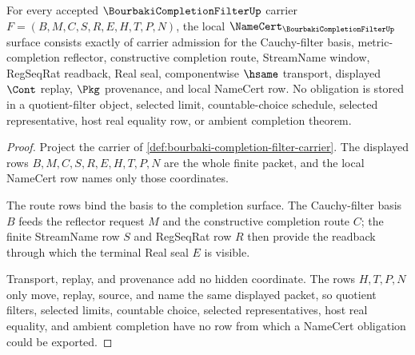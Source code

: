\begin{theorem}
\label{thm:bourbaki-completion-filter-namecert-obligations}
For every accepted $\BourbakiCompletionFilterUp$ carrier $F=(B,M,C,S,R,E,H,T,P,N)$, the local $\NameCert_{\BourbakiCompletionFilterUp}$ surface consists exactly of carrier admission for the Cauchy-filter basis, metric-completion reflector, constructive completion route, StreamName window, RegSeqRat readback, Real seal, componentwise $\hsame$ transport, displayed $\Cont$ replay, $\Pkg$ provenance, and local NameCert row. No obligation is stored in a quotient-filter object, selected limit, countable-choice schedule, selected representative, host real equality row, or ambient completion theorem.
\end{theorem}
\begin{proof}
Project the carrier of \autoref{def:bourbaki-completion-filter-carrier}. The displayed rows $B,M,C,S,R,E,H,T,P,N$ are the whole finite packet, and the local NameCert row names only those coordinates.

The route rows bind the basis to the completion surface. The Cauchy-filter basis $B$ feeds the reflector request $M$ and the constructive completion route $C$; the finite StreamName row $S$ and RegSeqRat row $R$ then provide the readback through which the terminal Real seal $E$ is visible.

Transport, replay, and provenance add no hidden coordinate. The rows $H,T,P,N$ only move, replay, source, and name the same displayed packet, so quotient filters, selected limits, countable choice, selected representatives, host real equality, and ambient completion have no row from which a NameCert obligation could be exported.
\end{proof}


